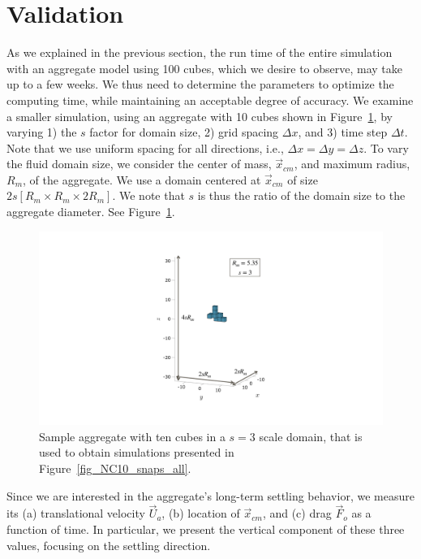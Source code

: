 \section{Validation}
\label{sec:ch3_validation}
As we explained in the previous section, the run time of the entire simulation with an aggregate model using 100 cubes, which we desire to observe, may take up to a few weeks. We thus need to determine the parameters to optimize the computing time, while maintaining an acceptable degree of accuracy. We examine a smaller simulation, using an aggregate with 10 cubes shown in Figure~\ref{fig_sample_agg10}, by varying 1) the $s$ factor for domain size, 2) grid spacing $\Delta x$, and 3) time step  $\Delta t$. Note that we use uniform spacing for all directions, i.e., $\Delta x = \Delta y = \Delta z$. To vary the fluid domain size, we consider the center of mass,  $\vec{x}_{cm}$, and maximum radius, $R_m$, of the aggregate.
We use a domain centered at $\vec{x}_{cm}$ of size  $2s\left[  R_m \times   R_m \times 2 R_m \right]$. We note that $s$ is thus the ratio of the domain size to the aggregate diameter. See Figure~\ref{fig_sample_agg10}.
\begin{figure}[ht]
	\begin{center}
		\includegraphics[scale=0.4]{./figures/fig_sample_agg10.pdf}
		\caption{Sample aggregate with ten cubes in a $s=3$ scale domain, that is used to obtain simulations presented in Figure~\ref{fig_NC10_snaps_all}. }
		\label{fig_sample_agg10}
	\end{center}
\end{figure}
\par
Since we are interested in the aggregate's long-term settling behavior, we measure its (a) translational velocity $\vec{U}_a$, (b) location of $\vec{x}_{cm}$, and (c) drag $\vec{F}_o$ as a function of time. 
In particular, we present the vertical component of these three values, focusing on the settling direction.
